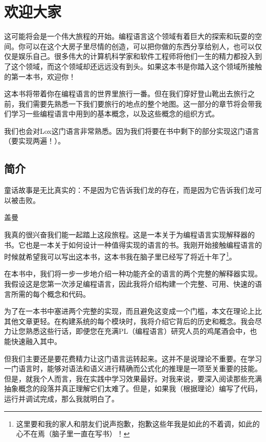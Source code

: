 \documentclass[cn,11pt,chinese]{elegantbook}
\begin{document}
\frontmatter

\tableofcontents

\mainmatter

\part{欢迎大家}

这可能将会是一个伟大旅程的开始。编程语言这个领域有着巨大的探索和玩耍的空间。你可以在这个大房子里尽情的创造，可以把你做的东西分享给别人，也可以仅仅是娱乐自己。很多伟大的计算机科学家和软件工程师将他们一生的精力都投入到了这个领域，而这个领域却还远远没有到头。如果这本书是你踏入这个领域所接触的第一本书，欢迎你！

这本书将带着你在编程语言的世界里旅行一番。但在我们穿好登山靴出去旅行之前，我们需要先熟悉一下我们要旅行的地点的整个地图。这一部分的章节将会带我们学习一些编程语言中用到的基本概念，以及这些概念的组织方式。

我们也会对Lox这门语言非常熟悉。因为我们将要在书中剩下的部分实现这门语言（要实现两遍！）。

\chapter{简介}

\epigraph{童话故事是无比真实的：不是因为它告诉我们龙的存在，而是因为它告诉我们龙可以被击败。}{盖曼}

我真的很兴奋我们能一起踏上这段旅程。这是一本关于为编程语言实现解释器的书。它也是一本关于如何设计一种值得实现的语言的书。我刚开始接触编程语言的时候就希望我可以写出这本书，这本书我在脑子里已经写了将近十年了\footnote{这里要和我的家人和朋友们说声抱歉，抱歉这些年我是如此的不着调，如此的心不在焉（脑子里一直在写书）！}。

在本书中，我们将一步一步地介绍一种功能齐全的语言的两个完整的解释器实现。我假设这是您第一次涉足编程语言，因此我将介绍构建一个完整、可用、快速的语言所需的每个概念和代码。

为了在一本书中塞进两个完整的实现，而且避免这变成一个门槛，本文在理论上比其他文章更轻。在构建系统的每个模块时，我将介绍它背后的历史和概念。我会尽力让您熟悉这些行话，即便您在充满PL（编程语言）研究人员的鸡尾酒会中，也能快速融入其中。

但我们主要还是要花费精力让这门语言运转起来。这并不是说理论不重要。在学习一门语言时，能够对语法和语义进行精确而公式化的推理是一项至关重要的技能。但是，就我个人而言，我在实践中学习效果最好。对我来说，要深入阅读那些充满抽象概念的段落并真正理解它们太难了。但是，如果我（根据理论）编写了代码，运行并调试完成，那么我就明白了。
\end{document}
